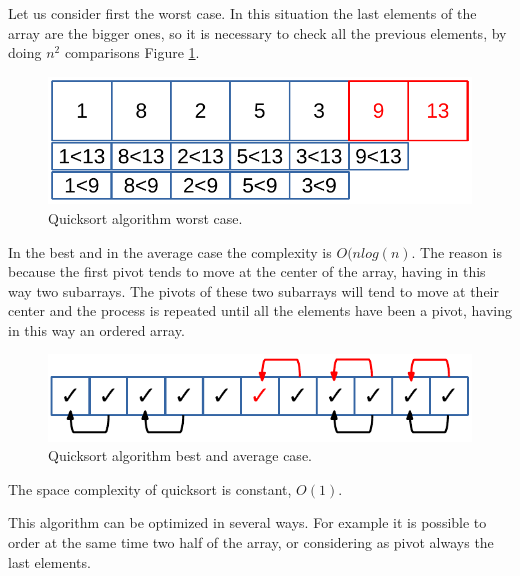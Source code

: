 Let us consider first the worst case. In this situation the last elements of the array are the bigger ones, so it is necessary to check all the previous elements, by doing \(n^{2}\) comparisons Figure \ref{sorting_10}.

\begin{figure}[H]
	\begin{center}
		\includegraphics[scale=.6]{chapters/searchandsorting/images/sorting_10.pdf}
		\caption[Quicksort algorithm worst case.]{Quicksort algorithm worst case.}
		\label{sorting_10}
	\end{center}
\end{figure}

In the best and in the average case the complexity is \(O(n log(n)\). The reason is because the first pivot tends to move at the center of the array, having in this way two subarrays. The pivots of these two subarrays will tend to move at their center and the process is repeated until all the elements have been a pivot, having in this way an ordered array.

\begin{figure}[H]
	\begin{center}
		\includegraphics[scale=.6]{chapters/searchandsorting/images/sorting_11.pdf}
		\caption[Quicksort algorithm best and average case.]{Quicksort algorithm best and average case.}
		\label{sorting_11}
	\end{center}
\end{figure}

The space complexity of quicksort is constant, \(O(1)\).

This algorithm can be optimized in several ways. For example it is possible to order at the same time two half of the array, or considering as pivot always the last elements.

